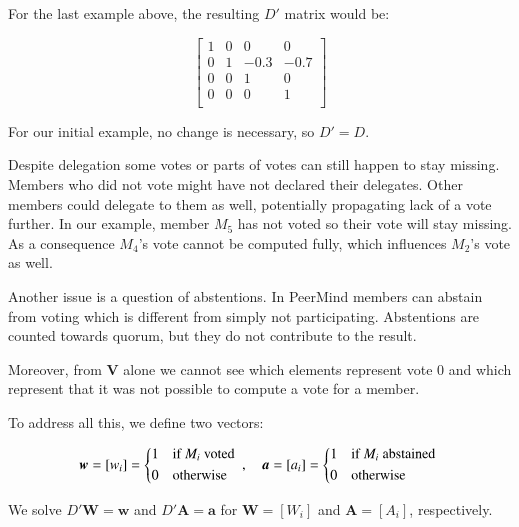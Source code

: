\documentclass{sigchi}
\begin{document}
For the last example above, the resulting $D'$ matrix would be:

\begin{displaymath}
\left[ \begin{array}{cccc}
1 & 0 & 0 & 0 \\
0 & 1 & -0.3 & -0.7 \\
0 & 0 & 1 & 0 \\
0 & 0 & 0 & 1\\
\end{array} \right]
\end{displaymath}

For our initial example, no change is necessary, so $D' = D$.

Despite delegation some votes or parts of votes can still happen to stay missing.
Members who did not vote might have not declared their delegates.
Other members could delegate to them as well, potentially propagating lack of a vote further.
In our example, member $M_5$ has not voted so their vote will stay missing.
As a consequence $M_4$'s vote cannot be computed fully, which influences $M_2$'s vote as well.

Another issue is a question of abstentions.
In PeerMind members can abstain from voting which is different from simply not participating.
Abstentions are counted towards quorum, but they do not contribute to the result.

Moreover, from $\boldsymbol{V}$ alone we cannot see which elements represent vote $0$ and which
represent that it was not possible to compute a vote for a member.

To address all this, we define two vectors:

\begin{displaymath}
\boldsymbol{w} = \left[w_i\right] = \begin{dcases*}
 1 & if $M_i$ voted \\
 0 & otherwise \\
\end{dcases*},\quad \boldsymbol{a} = \left[a_i\right] = \begin{dcases*}
 1 & if $M_i$ abstained \\
 0 & otherwise \\
\end{dcases*}
\end{displaymath}

We solve $D' \boldsymbol{W} = \boldsymbol{w}$ and $D' \boldsymbol{A} = \boldsymbol{a}$ for
$\boldsymbol{W} = \left[W_{i}\right]$ and $\boldsymbol{A} = \left[A_{i}\right]$, respectively.
\end{document}

